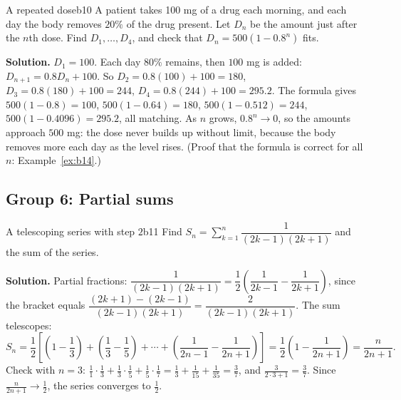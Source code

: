 \documentclass[11pt]{article}
\begin{document}
\begin{exmp}{A repeated dose}{b10}
A patient takes 100 mg of a drug each morning, and each day the body removes $20\%$ of the drug present. Let $D_n$ be the amount just after the $n$th dose. Find $D_1,\dots,D_4$, and check that $D_n=500(1-0.8^n)$ fits.

\textbf{Solution.} $D_1=100$. Each day $80\%$ remains, then $100$ mg is added: $D_{n+1}=0.8D_n+100$. So $D_2=0.8(100)+100=180$, $D_3=0.8(180)+100=244$, $D_4=0.8(244)+100=295.2$. The formula gives $500(1-0.8)=100$, $500(1-0.64)=180$, $500(1-0.512)=244$, $500(1-0.4096)=295.2$, all matching. As $n$ grows, $0.8^n\to0$, so the amounts approach $500$ mg: the dose never builds up without limit, because the body removes more each day as the level rises. (Proof that the formula is correct for all $n$: Example~\ref{ex:b14}.)
\end{exmp}

\subsection*{Group 6: Partial sums}

\begin{exmp}{A telescoping series with step $2$}{b11}
Find $S_n=\sum_{k=1}^n\dfrac1{(2k-1)(2k+1)}$ and the sum of the series.

\textbf{Solution.} Partial fractions: $\dfrac1{(2k-1)(2k+1)}=\dfrac12\left(\dfrac1{2k-1}-\dfrac1{2k+1}\right)$, since the bracket equals $\dfrac{(2k+1)-(2k-1)}{(2k-1)(2k+1)}=\dfrac2{(2k-1)(2k+1)}$. The sum telescopes:
\[
S_n=\frac12\left[\left(1-\frac13\right)+\left(\frac13-\frac15\right)+\cdots+\left(\frac1{2n-1}-\frac1{2n+1}\right)\right]=\frac12\left(1-\frac1{2n+1}\right)=\frac n{2n+1}.
\]
Check with $n=3$: $\frac11\!\cdot\!\frac13+\frac13\!\cdot\!\frac15+\frac15\!\cdot\!\frac17=\frac13+\frac1{15}+\frac1{35}=\frac37$, and $\frac3{2\cdot3+1}=\frac37$. Since $\frac n{2n+1}\to\frac12$, the series converges to $\frac12$.
\end{exmp}
\end{document}

